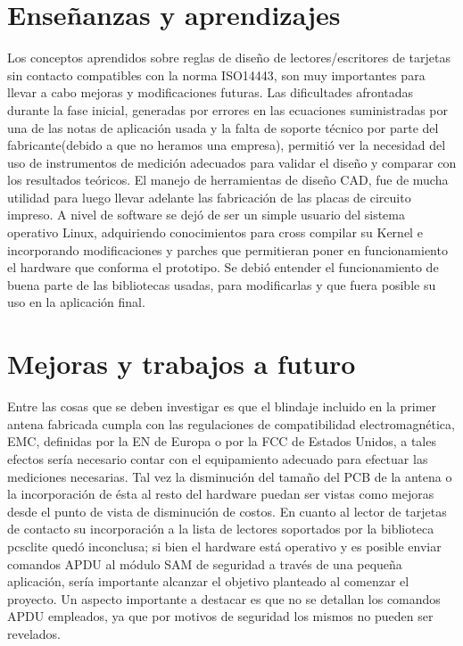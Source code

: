 \section{Enseñanzas y aprendizajes}
Los conceptos aprendidos sobre reglas de diseño de lectores/escritores de 
tarjetas sin contacto compatibles con la norma ISO14443, son muy importantes
para llevar a cabo mejoras y modificaciones futuras. Las dificultades afrontadas
durante la fase inicial, generadas por errores en las ecuaciones suministradas
por una de las notas de aplicación usada y la falta de soporte técnico por
parte del fabricante(debido a que no heramos una empresa), permitió ver la 
necesidad del uso de instrumentos de medición adecuados para validar el 
diseño y comparar con los resultados teóricos.
El manejo de herramientas de diseño CAD, fue de mucha utilidad para luego
llevar adelante las fabricación de las placas de circuito impreso.
A nivel de software se dejó de ser un simple usuario del sistema operativo
Linux, adquiriendo conocimientos para cross compilar su Kernel e incorporando
modificaciones y parches que permitieran poner en funcionamiento el hardware
que conforma el prototipo. Se debió entender el funcionamiento de buena parte
de las bibliotecas usadas, para modificarlas y que fuera posible su uso en la 
aplicación final. 


\section{Mejoras y trabajos a futuro}
Entre las cosas que se deben investigar es que el blindaje incluido en la 
primer antena fabricada cumpla con las regulaciones de compatibilidad 
electromagnética, EMC, definidas por la EN de Europa o por la FCC de Estados 
Unidos, a tales efectos sería necesario contar con el equipamiento adecuado
para efectuar las mediciones necesarias.
Tal vez la disminución del tamaño del PCB de la antena o la incorporación
de ésta al resto del hardware puedan ser vistas como mejoras desde el 
punto de vista de disminución de costos.
En cuanto al lector de tarjetas de contacto su incorporación a la lista
de lectores soportados por la biblioteca pcsclite quedó inconclusa; si 
bien el hardware está operativo y es posible enviar comandos APDU al 
módulo SAM de seguridad a través de una pequeña aplicación, sería 
importante alcanzar el objetivo planteado al comenzar el proyecto.
Un aspecto importante a destacar es que no se detallan los comandos
APDU empleados, ya que por motivos de seguridad los mismos no pueden 
ser revelados.

